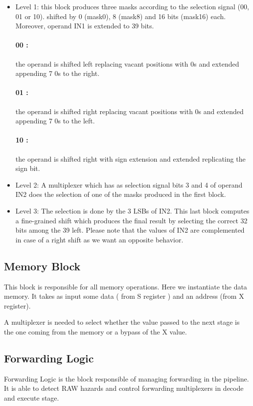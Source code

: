 \documentclass[12pt]{article}
\begin{document}
\begin{itemize}
	\item Level 1: this block produces three masks according to the selection signal (00, 01 or 10).
	shifted by 0 (mask0), 8 (mask8) and 16 bits (mask16) each. Moreover, operand IN1 is extended
	to 39 bits.
	\paragraph{00 :} the operand is shifted left replacing vacant positions with 0s and extended appending
	7 0s to the right.
	\paragraph{01 :} the operand is shifted right replacing vacant positions with 0s and extended appending
	7 0s to the left.
	\paragraph{10 :} the operand is shifted right with sign extension and extended replicating the sign bit.
	
	\item Level 2: A multiplexer which has as selection signal bits 3 and 4 of operand IN2 does the selection of one of the masks produced in the first block.
	\item Level 3: The selection is done by the 3 LSBs of IN2. This last block computes a fine-grained shift which produces the final result by selecting the correct 32 bits among the 39 left.
	Please note that the values of IN2 are complemented in case of a right shift as we want an opposite behavior.
\end{itemize}


\subsection{Memory Block}
This block is responsible for all memory operations.
Here we instantiate the data memory. It takes as input some data ( from S register ) and an address (from X register).

A multiplexer is needed to select whether the value passed to the next stage is the one coming from the memory or a bypass of the X value.

\subsection{Forwarding Logic}
Forwarding Logic is the block responsible of managing forwarding in the pipeline. It is able to detect RAW hazards and control forwarding multiplexers in decode and execute stage.
\end{document}

